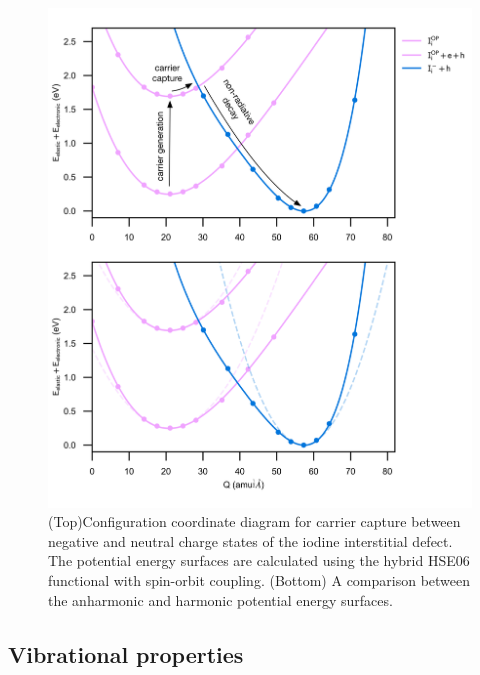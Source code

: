  
\begin{figure}[h!]   
\centering
  \includegraphics[width=1.0\columnwidth]{figures/ch6/carrier_capture_digram.png}
  \caption[Configuration coordinate diagram for carrier capture between negative and neutral charge states of the iodine interstitial defect]{(Top)Configuration coordinate diagram for carrier capture between negative and neutral charge states of the iodine interstitial defect. The potential energy surfaces are calculated using the hybrid HSE06 functional with spin-orbit coupling. (Bottom) A comparison between the anharmonic and harmonic potential energy surfaces. }
\label{configuration_coordinate}
\end{figure}


\subsection{Vibrational properties}

